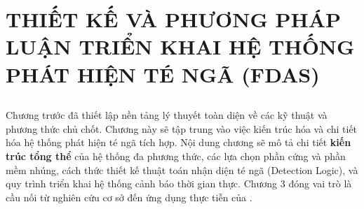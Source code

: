 
\chapter[THIẾT KẾ VÀ THỰC HIỆN HỆ THỐNG PHÁT HIỆN TÉ NGÃ]{THIẾT KẾ VÀ PHƯƠNG PHÁP LUẬN TRIỂN KHAI HỆ THỐNG PHÁT HIỆN TÉ NGÃ (FDAS)}
\label{chap:methodology} %

\section*{} %
Chương trước đã thiết lập nền tảng lý thuyết toàn diện về các kỹ thuật và phương thức chủ chốt. Chương này sẽ tập trung vào việc kiến trúc hóa và chi tiết hóa hệ thống phát hiện té ngã tích hợp. Nội dung chương sẽ mô tả chi tiết \textbf{kiến trúc tổng thể} của hệ thống đa phương thức, các lựa chọn phần cứng và phần mềm nhúng, cách thức thiết kế thuật toán nhận diện té ngã (Detection Logic), và quy trình triển khai hệ thống cảnh báo thời gian thực. Chương 3 đóng vai trò là cầu nối từ nghiên cứu cơ sở đến ứng dụng thực tiễn của \TENLUANVAN.




